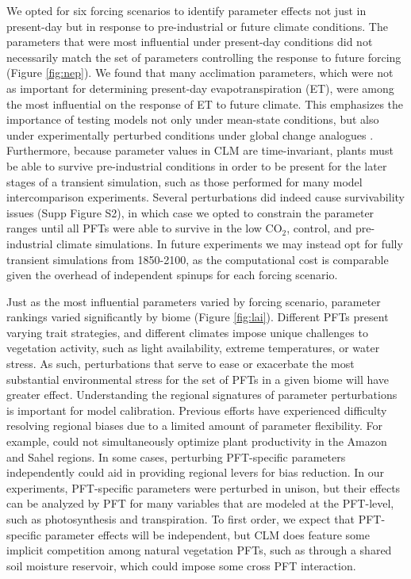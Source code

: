 \documentclass[draft]{agujournal2019}
\begin{document}
We opted for six forcing scenarios to identify parameter effects not just in present-day but in response to pre-industrial or future climate conditions. The parameters that were most influential under present-day conditions did not necessarily match the set of parameters controlling the response to future forcing (Figure \ref{fig:nep}). We found that many acclimation parameters, which were not as important for determining present-day evapotranspiration (ET), were among the most influential on the response of ET to future climate. This emphasizes the importance of testing models not only under mean-state conditions, but also under experimentally perturbed conditions under global change analogues \cite{wieder2019}. Furthermore, because parameter values in CLM are time-invariant, plants must be able to survive pre-industrial conditions in order to be present for the later stages of a transient simulation, such as those performed for many model intercomparison experiments. Several perturbations did indeed cause survivability issues (Supp Figure S2), in which case we opted to constrain the parameter ranges until all PFTs were able to survive in the low CO$_2$, control, and pre-industrial climate simulations. In future experiments we may instead opt for fully transient simulations from 1850-2100, as the computational cost is comparable given the overhead of independent spinups for each forcing scenario.

Just as the most influential parameters varied by forcing scenario, parameter rankings varied significantly by biome (Figure \ref{fig:lai}). Different PFTs present varying trait strategies, and different climates impose unique challenges to vegetation activity, such as light availability, extreme temperatures, or water stress. As such, perturbations that serve to ease or exacerbate the most substantial environmental stress for the set of PFTs in a given biome will have greater effect. Understanding the regional signatures of parameter perturbations is important for model calibration. Previous efforts have experienced difficulty resolving regional biases due to a limited amount of parameter flexibility. For example, \cite{dagon2020} could not simultaneously optimize plant productivity in the Amazon and Sahel regions. In some cases, perturbing PFT-specific parameters independently could aid in providing regional levers for bias reduction. In our experiments, PFT-specific parameters were perturbed in unison, but their effects can be analyzed by PFT for many variables that are modeled at the PFT-level, such as photosynthesis and transpiration. To first order, we expect that PFT-specific parameter effects will be independent, but CLM does feature some implicit competition among natural vegetation PFTs, such as through a shared soil moisture reservoir, which could impose some cross PFT interaction. 
\end{document}
